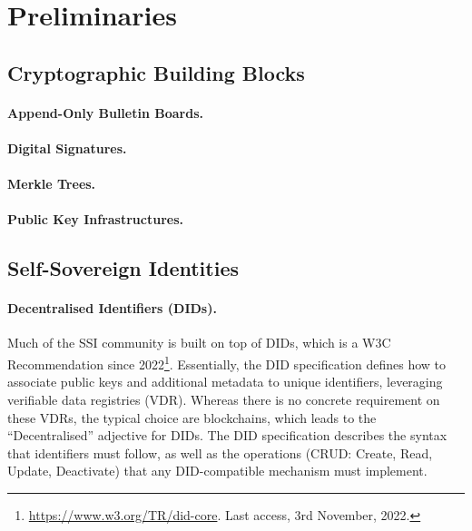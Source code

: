 \section{Preliminaries}
\label{sec:preliminaries}

\subsection{Cryptographic Building Blocks}
\label{ssec:bbs}


\paragraph{Append-Only Bulletin Boards.} %

\paragraph{Digital Signatures.} %

\paragraph{Merkle Trees.}

\paragraph{Public Key Infrastructures.} %

\subsection{Self-Sovereign Identities}
\label{ssec:ssi}

\paragraph{Decentralised Identifiers (DIDs).} %
Much of the SSI community is built on top of DIDs, which is a W3C Recommendation
since 2022\footnote{\url{https://www.w3.org/TR/did-core}. Last access, 3rd
  November, 2022.}. Essentially, the DID specification defines how to associate
public keys and additional metadata to unique identifiers, leveraging verifiable
data registries (VDR). Whereas there is no concrete requirement on these VDRs,
the typical choice are blockchains, which leads to the ``Decentralised''
adjective for DIDs. The DID specification describes the syntax that identifiers
must follow, as well as the operations (CRUD: Create, Read, Update, Deactivate)
that any DID-compatible mechanism must implement.

